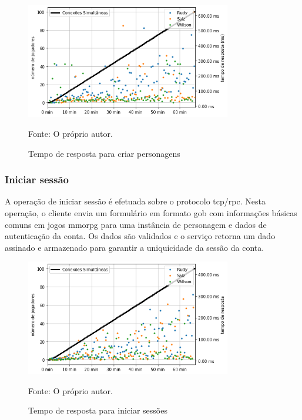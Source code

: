 \begin{figure}[htb!]
  \caption{Tempo de resposta para criar personagens}
  \label{fig:create_character_operation_request}
  \includegraphics[width=0.8\textwidth]{figuras/analise/rt/create_character_operation_request.png}
  \centering

  Fonte: O próprio autor.
\end{figure}

\subsubsection{Iniciar sessão}

A operação de iniciar sessão é efetuada sobre o protocolo \ac{tcp}/\ac{rpc}.
%
Nesta operação, o cliente envia um formulário em formato \ac{gob} com informações básicas comuns em jogos \ac{mmorpg} para uma instância de personagem e dados de autenticação da conta.
%
Os dados são validados e o serviço retorna um dado assinado e armazenado para garantir a uniquicidade da sessão da conta.

\begin{figure}[htb!]
  \caption{Tempo de resposta para iniciar sessões}
  \label{fig:start_session_request_time}
  \includegraphics[width=0.8\textwidth]{figuras/analise/rt/start_session_request_time.png}
  \centering

  Fonte: O próprio autor.
\end{figure}

